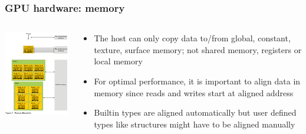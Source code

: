\begin{frame}[fragile]
  \frametitle{GPU hardware: memory}
\begin{columns}
\begin{column}{0.5\textwidth}
\includegraphics[width=6.0cm]{graphs/memory_hierarchy.png}
\end{column}
\begin{column}{0.5\textwidth}
\begin{itemize}
\item The host can only copy data to/from global, constant, texture, surface memory; not shared memory, registers or local memory
\item For optimal performance, it is important to {\color{mycolordef}align} data in memory since reads and writes start at aligned address
\item Builtin types are aligned automatically but user defined types like structures might have to be aligned manually
\end{itemize}
\end{column}
\end{columns}
\end{frame}

